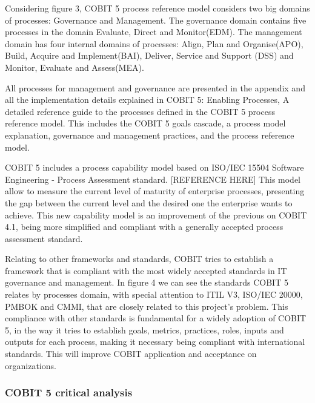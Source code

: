 Considering figure 3, COBIT 5 process reference model considers two big domains of processes: Governance and Management. The governance domain contains five processes in the domain Evaluate, Direct and Monitor(EDM). The management domain has four internal domains of processes: Align, Plan and Organise(APO), Build, Acquire and Implement(BAI), Deliver, Service and Support (DSS) and Monitor, Evaluate and Assess(MEA).\par
All processes for management and governance are presented in the appendix and all the implementation details explained in COBIT 5: Enabling Processes, A detailed reference guide to the processes defined in the COBIT 5 process reference model. This includes the COBIT 5 goals cascade, a process model explanation, governance and management practices, and the process reference model\cite{2012cobitEP}.\par
COBIT 5 includes a process capability model based on ISO/IEC 15504 Software Engineering - Process Assessment standard. [REFERENCE HERE] This model allow to measure the current level of maturity of enterprise processes, presenting the gap between the current level and the desired one the enterprise wants to achieve. This new capability model is an improvement of the previous on COBIT 4.1, being more simplified and compliant with a generally accepted process assessment standard.\par
Relating to other frameworks and standards, COBIT tries to establish a framework that is compliant with the most widely accepted standards in IT governance and management. In figure 4 we can see the standards COBIT 5 relates by processes domain, with special attention to ITIL V3, ISO/IEC 20000, PMBOK and CMMI, that are closely related to this project's problem. This compliance with other standards is fundamental for a widely adoption of COBIT 5, in the way it tries to establish goals, metrics, practices, roles, inputs and outputs for each process, making it necessary being compliant with international standards. This will improve COBIT application and acceptance on organizations.\par

\subsubsection{COBIT 5 critical analysis}

